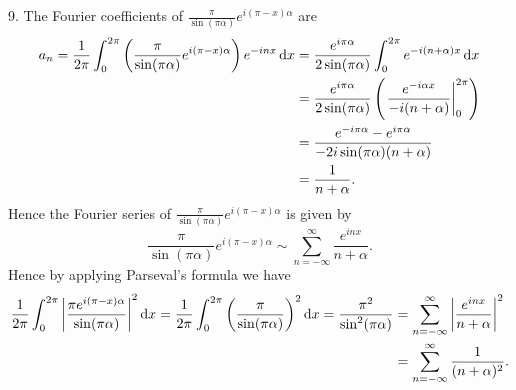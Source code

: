 \documentclass[11pt]{article}
\newcommand{\br}[1]{\left(#1\right)}
\begin{document}
9. The Fourier coefficients of $\frac{\pi}{\sin(\pi\alpha)}e^{i(\pi-x)\alpha}$ are  
\begin{align*}
  a_n = \frac{1}{2\pi}\int_0^{2\pi}\br{\frac{\pi}{\sin(\pi\alpha)}e^{i(\pi-x)\alpha}}e^{-inx}\dd{x} &= \frac{e^{i\pi \alpha}}{2\sin(\pi\alpha)}\int_0^{2\pi} e^{-i(n+\alpha)x}\dd{x}\\
  &= \frac{e^{i\pi \alpha}}{2\sin(\pi\alpha)}\br{\eval{\frac{e^{-i\alpha x}}{-i(n+\alpha)}}_{0}^{2\pi}}\\
  &= \frac{e^{-i\pi\alpha} - e^{i\pi\alpha}}{-2i\sin(\pi\alpha)(n+\alpha)}\\
  &= \frac{1}{n+\alpha}.
\end{align*}
Hence the Fourier series of $\frac{\pi}{\sin(\pi\alpha)}e^{i(\pi-x)\alpha}$ is given by \[\frac{\pi}{\sin(\pi\alpha)}e^{i(\pi-x)\alpha} \sim \sum_{n=-\infty}^{\infty}\frac{e^{inx}}{n+\alpha}.\]
Hence by applying Parseval's formula we have \begin{align*}
  \frac{1}{2\pi}\int_0^{2\pi}\abs{\frac{\pi e^{i(\pi-x)\alpha}}{\sin(\pi\alpha)}}^2\dd{x}  = \frac{1}{2\pi}\int_0^{2\pi}\br{\frac{\pi}{\sin(\pi\alpha)}}^2\dd{x} = \frac{\pi^2}{\sin^2(\pi\alpha)} &= \sum_{n=-\infty}^{\infty}\abs{\frac{e^{inx}}{n+\alpha}}^2\\
  &= \sum_{n=-\infty}^{\infty} \frac{1}{(n+\alpha)^2}.
\end{align*}
\end{document}

